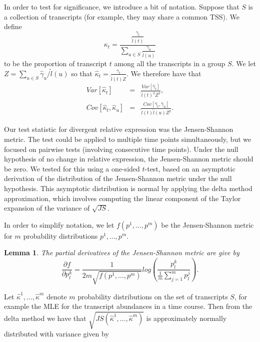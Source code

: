 \documentclass[12pt]{amsart}
\newtheorem{lemma}[thm]{Lemma}
\theoremstyle{definition}
\begin{document}
In order to test for significance, we introduce a bit of notation.
Suppose that $S$ is a collection of transcripts (for example, they may
 share a common TSS). We define
\begin{equation}
\kappa_t = \frac{ \frac{\gamma_t}{\tilde{l}(t)}}{\sum_{u \in S} \frac{\gamma_u}{\tilde{l}(u)}}
\end{equation}
to be the proportion of transcript $t$ among all the transcripts in a
group $S$. We let 
$Z=\sum_{u \in S} \hat{\gamma}_u / \tilde{l}(u)$ so that $\hat{\kappa}_t = \frac{\gamma_t}{\tilde{l}(t)Z}$. We therefore have that
\begin{eqnarray}
\label{eq:variancekappa1}
Var[\hat{\kappa}_t] & =  &\frac{Var[\hat{\gamma}_t]}{\tilde{l}(t)^2Z^2}, \\
Cov[\hat{\kappa}_t,\hat{\kappa}_u] & =  & \frac{Cov[\hat{\gamma}_t,\hat{\gamma}_u]}{\tilde{l}(t)\tilde{l}(u)Z^2}.\label{eq:variancekappa2}
\end{eqnarray}

Our test statistic for divergent relative expression was the
Jensen-Shannon metric. The test could be applied to multiple time
points simultaneously, but we focused on pairwise tests (involving
consecutive time points). Under the null hypothesis of no change in
relative expression, the Jensen-Shannon metric should be
zero. We tested for this using a one-sided $t$-test, based on an
asymptotic derivation of the distribution of the Jensen-Shannon metric
under the null hypothesis. This asymptotic distribution is normal by applying the delta method approximation,
which involves computing the linear component of the Taylor expansion of the
variance of $\sqrt{JS}$.

In order to simplify notation, we let $f(p^1,\ldots,p^m)$ be the
Jensen-Shannon metric for $m$ probability distributions $p^1,\ldots,p^m$.

\begin{lemma}
The partial derivatives of the Jensen-Shannon metric are give by
\begin{equation}
\frac{\partial f}{\partial p^k_l} = \frac{1}{2m\sqrt{f(p^1,\ldots,p^m)}} log \left( \frac{p^k_l}{\frac{1}{m} \sum_{j=1}^m p_l^j} \right).
\end{equation}
\end{lemma}

Let $\hat{\kappa}^1,\ldots,\hat{\kappa}^m$ denote $m$ probability
distributions on the set of transcripts $S$, for example the MLE for the transcript abundances in a time course. Then from the delta method we
have that $\sqrt{JS(\hat{\kappa}^1,\ldots,\hat{\kappa}^m)}$ is approximately normally
distributed with variance given by
\end{document}
